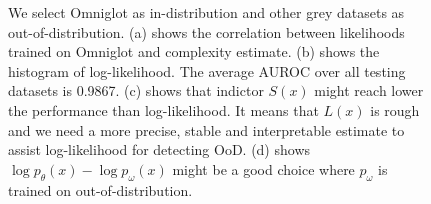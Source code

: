 \documentclass[letterpaper]{article} %
\begin{document}
\begin{figure}[t]
\centering
{}
\caption{We select Omniglot as in-distribution and other grey datasets as out-of-distribution. (a) shows the correlation between likelihoods trained on Omniglot and complexity estimate. (b) shows the histogram of log-likelihood. The average AUROC over all testing datasets is 0.9867. (c) shows that indictor $S(x)$ might reach lower the performance than log-likelihood. It means that $L(x)$ is rough and we need a more precise, stable and interpretable estimate to assist log-likelihood for detecting OoD. (d) shows $\log p_\theta(x) - \log p_\omega(x)$ might be a good choice where $p_\omega$ is trained on out-of-distribution. }
\label{fig2}
\end{figure}
\end{document}
